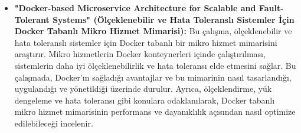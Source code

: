 \begin{itemize}
\item \textbf{"Docker-based Microservice Architecture for Scalable and Fault-Tolerant Systems" (Ölçeklenebilir ve Hata Toleranslı Sistemler İçin Docker Tabanlı Mikro Hizmet Mimarisi):}
Bu çalışma, ölçeklenebilir ve hata toleranslı sistemler için Docker tabanlı bir mikro hizmet mimarisini araştırır. Mikro hizmetlerin Docker konteynerleri içinde çalıştırılması, sistemlerin daha iyi ölçeklenebilirlik ve hata toleransı elde etmesini sağlar. Bu çalışmada, Docker'ın sağladığı avantajlar ve bu mimarinin nasıl tasarlandığı, uygulandığı ve yönetildiği üzerinde durulur. Ayrıca, ölçeklendirme, yük dengeleme ve hata toleransı gibi konulara odaklanılarak, Docker tabanlı mikro hizmet mimarisinin performans ve dayanıklılık açısından nasıl optimize edilebileceği incelenir.\\
\end{itemize}
